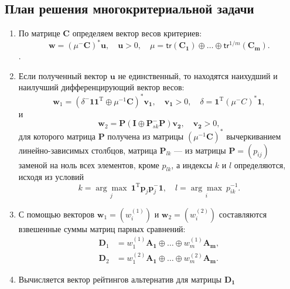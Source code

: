 \documentclass[specialist,
  substylefile = spbu.rtx,
  href,
  colorlinks=true,
  12pt]{disser}
\begin{document}
\subsection{План решения многокритериальной задачи}
\begin{enumerate}
	\item По матрице $\boldsymbol{C}$ определяем вектор весов критериев:
	\begin{equation*}
		\boldsymbol{w} = (\mu^{-}\boldsymbol{C})^*\boldsymbol{u},\quad  \boldsymbol{u} > 0,\quad \mu = \mathsf{tr}(\boldsymbol{C_1}) \oplus\ldots\oplus \mathsf{tr}^{1/m}(\boldsymbol{C_m}).
	\end{equation*}.
	\item Если полученный вектор $\boldsymbol{u}$ не единственный, то находятся наихудший и наилучший дифференцирующий вектор весов:
	\begin{equation*}
		\boldsymbol{w}_1 = (\delta^-\boldsymbol{11}^\mathrm{T} \oplus \mu^{-1}\boldsymbol{C})^*\boldsymbol{v_1},\quad  \boldsymbol{v_1} > 0,\quad \delta = \boldsymbol{1}^\mathrm{T}(\mu^{-}C)^*\boldsymbol{1}, 
	\end{equation*}
	и
	\begin{equation*}
		\boldsymbol{w}_2 =\boldsymbol{P}(\boldsymbol{I}\oplus\boldsymbol{P}^{-}_{sk}\boldsymbol{P})\boldsymbol{v_2},\quad \boldsymbol{v_2} > 0, 
	\end{equation*}
	для которого матрица $\boldsymbol{P}$ получена из матрицы $(\mu^{-1}\boldsymbol{C})^*$ вычеркиванием линейно-зависимых столбцов, матрица $\boldsymbol{P}_{lk}$ --- из матрицы $\boldsymbol{P} = (p_{ij})$ заменой на ноль всех элементов, кроме $p_{lk}$, а индексы $k$ и $l$ определяются, исходя из условий
	\begin{equation*}
		k = \underset{j}{\arg\max}~\boldsymbol{1}^\mathrm{T}\boldsymbol{p}_j\boldsymbol{p}^-_j\boldsymbol{1},\quad l = \underset{i}{\arg\max} ~p^{-1}_{ik}.
	\end{equation*}
	\item С помощью векторов $\boldsymbol{w}_1 = (w^{(1)}_i)$ и $\boldsymbol{w}_2 = (w^{(2)}_i)$ составляются взвешенные
	суммы матриц парных сравнений:
	\begin{align*}
		\boldsymbol{D}_1 &= w^{(1)}_1\boldsymbol{A_1}\oplus\ldots\oplus w^{(1)}_m\boldsymbol{A_m}, \\
		\boldsymbol{D}_2 &=w^{(2)}_1\boldsymbol{A_1}\oplus\ldots\oplus w^{(2)}_m\boldsymbol{A_m}.
	\end{align*}
	\item Вычисляется вектор рейтингов альтернатив для матрицы $\boldsymbol{D_1}$

\end{enumerate}
\end{document}
